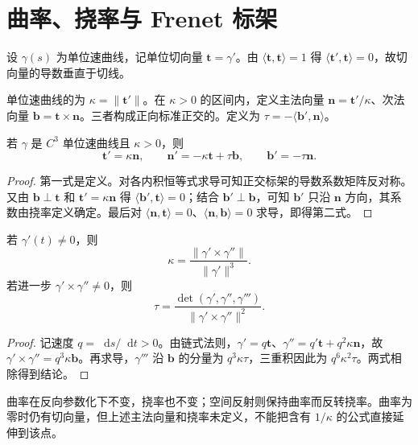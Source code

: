 \documentclass[UTF8,12pt,a4paper,fontset=fandol]{ctexbook}
\newcommand{\dd}{\mathop{}\!\mathrm d}
\newcommand{\ip}[2]{\langle #1,#2\rangle}
\newcommand{\norm}[1]{\lVert #1\rVert}
\begin{document}
\section{曲率、挠率与 Frenet 标架}
设 $\gamma(s)$ 为单位速曲线，记单位切向量 $\mathbf t=\gamma'$。由 $\ip{\mathbf t}{\mathbf t}=1$ 得 $\ip{\mathbf t'}{\mathbf t}=0$，故切向量的导数垂直于切线。
\begin{definition}
单位速曲线的为 $\kappa=\norm{\mathbf t'}$。在 $\kappa>0$ 的区间内，定义主法向量 $\mathbf n=\mathbf t'/\kappa$、次法向量 $\mathbf b=\mathbf t\times\mathbf n$。三者构成正向标准正交的。定义为 $\tau=-\ip{\mathbf b'}{\mathbf n}$。
\end{definition}

\begin{theorem}
若 $\gamma$ 是 $C^3$ 单位速曲线且 $\kappa>0$，则
\begin{equation}
 \mathbf t'=\kappa\mathbf n,\qquad
 \mathbf n'=-\kappa\mathbf t+\tau\mathbf b,\qquad
 \mathbf b'=-\tau\mathbf n.
 \label{eq:dg-frenet}
\end{equation}
\end{theorem}
\begin{proof}
第一式是定义。对各内积恒等式求导可知正交标架的导数系数矩阵反对称。又由 $\mathbf b\perp\mathbf t$ 和 $\mathbf t'=\kappa\mathbf n$ 得 $\ip{\mathbf b'}{\mathbf t}=0$；结合 $\mathbf b'\perp\mathbf b$，可知 $\mathbf b'$ 只沿 $\mathbf n$ 方向，其系数由挠率定义确定。最后对 $\ip{\mathbf n}{\mathbf t}=0$、$\ip{\mathbf n}{\mathbf b}=0$ 求导，即得第二式。
\end{proof}

\begin{proposition}[一般参数公式]
若 $\gamma'(t)\ne0$，则
\begin{equation}
 \kappa=\frac{\norm{\gamma'\times\gamma''}}{\norm{\gamma'}^3}.
 \label{eq:dg-curvature-general}
\end{equation}
若进一步 $\gamma'\times\gamma''\ne0$，则
\begin{equation}
 \tau=\frac{\det(\gamma',\gamma'',\gamma''')}{\norm{\gamma'\times\gamma''}^2}.
 \label{eq:dg-torsion-general}
\end{equation}
\end{proposition}
\begin{proof}
记速度 $q=\dd s/\dd t>0$。由链式法则，$\gamma'=q\mathbf t$、$\gamma''=q'\mathbf t+q^2\kappa\mathbf n$，故 $\gamma'\times\gamma''=q^3\kappa\mathbf b$。再求导，$\gamma'''$ 沿 $\mathbf b$ 的分量为 $q^3\kappa\tau$，三重积因此为 $q^6\kappa^2\tau$。两式相除得到结论。
\end{proof}
曲率在反向参数化下不变，挠率也不变；空间反射则保持曲率而反转挠率。曲率为零时仍有切向量，但上述主法向量和挠率未定义，不能把含有 $1/\kappa$ 的公式直接延伸到该点。
\end{document}
